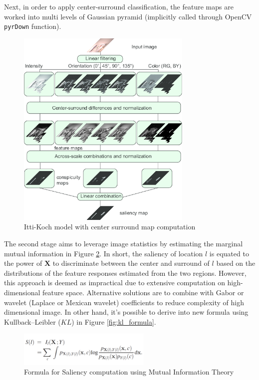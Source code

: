 \documentclass[conference]{IEEEtran}
\begin{document}
Next, in order to apply center-surround classification, the feature maps are worked into multi levels of Gaussian pyramid (implicitly called through OpenCV \texttt{pyrDown} function).
 
\begin{figure}[h]
    \centering
    \includegraphics[width=3.3in]{itti.png}
    \caption{Itti-Koch model with center surround map computation}
    \label{fig:itti}
\end{figure}

The second stage aims to leverage image statistics by estimating the marginal mutual information in Figure \ref{fig:mi_formula}. In short, the saliency of location $l$ is equated to the power of $\textbf{X}$ to discriminate between the center and surround of $l$ based on the distributions of the feature responses estimated from the two regions. However, this approach is deemed as impractical due to extensive computation on high-dimensional feature space. Alternative solutions are to combine with Gabor or wavelet (Laplace or Mexican wavelet) coefficients to reduce complexity of high dimensional image. In other hand, it's possible to derive into new formula using Kullback–Leibler ($KL$) in Figure \ref{fig:kl_formula}.

\begin{figure}[h]
    \centering
    \includegraphics[width=2.5in]{MI.png}
    \caption{Formula for Saliency computation using Mutual Information Theory}
    \label{fig:mi_formula}
\end{figure}
 
\end{document}
